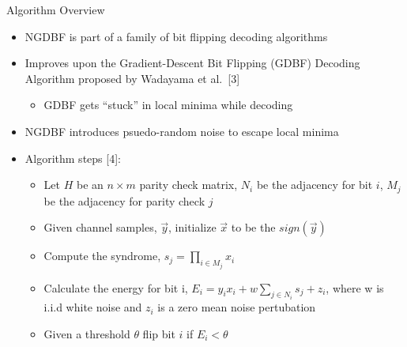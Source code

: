\documentclass[10pt,ignorenonframetext,]{beamer}
\providecommand{\tightlist}{%
  \setlength{\itemsep}{0pt}\setlength{\parskip}{0pt}}
\begin{document}
\begin{frame}{Algorithm Overview}
\protect\hypertarget{algorithm-overview}{}
\begin{itemize}[<+->]
\tightlist
\item
  NGDBF is part of a family of bit flipping decoding algorithms
\item
  Improves upon the Gradient-Descent Bit Flipping (GDBF) Decoding
  Algorithm proposed by Wadayama et al.~{[}3{]}

  \begin{itemize}[<+->]
  \tightlist
  \item
    GDBF gets ``stuck'' in local minima while decoding
  \end{itemize}
\item
  NGDBF introduces psuedo-random noise to escape local minima
\item
  Algorithm steps {[}4{]}:

  \begin{itemize}[<+->]
  \tightlist
  \item
    Let \(H\) be an \(n\times m\) parity check matrix, \(N_i\) be the
    adjacency for bit \(i\), \(M_j\) be the adjacency for parity check
    \(j\)
  \item
    Given channel samples, \(\vec{y}\), initialize \(\vec{x}\) to be the
    \(sign(\vec{y})\)
  \item
    Compute the syndrome, \(s_j = \prod_{i\in M_j}x_i\)
  \item
    Calculate the energy for bit i,
    \(E_i = y_ix_i+w\sum_{j\in N_i}s_j + z_i\), where w is i.i.d white
    noise and \(z_i\) is a zero mean noise pertubation
  \item
    Given a threshold \(\theta\) flip bit \(i\) if \(E_i < \theta\)
  \end{itemize}
\end{itemize}


\end{frame}
\end{document}
